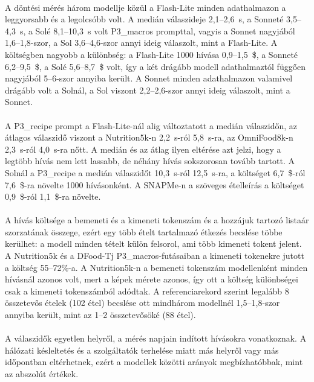 \paragraph{}A döntési mérés három modellje közül a Flash-Lite minden adathalmazon a leggyorsabb 
és a legolcsóbb volt. A medián válaszideje 2,1--2,6~s, a Sonneté 3,5--4,3~s, a Solé 
8,1--10,3~s volt P3\_macros prompttal, vagyis a Sonnet nagyjából 1,6--1,8-szor, 
a Sol 3,6--4,6-szor annyi ideig válaszolt, mint a Flash-Lite. A költségben 
nagyobb a különbség: a Flash-Lite 1000 hívása 0,9--1,5~\$, a Sonneté 
6,2--9,5~\$, a Solé 5,6--8,7~\$ volt, így a két drágább modell adathalmaztól 
függően nagyjából 5--6-szor annyiba került. A Sonnet minden adathalmazon 
valamivel drágább volt a Solnál, a Sol viszont 2,2--2,6-szor annyi ideig 
válaszolt, mint a Sonnet.

\paragraph{}A P3\_recipe prompt a Flash-Lite-nál alig változtatott a medián 
válaszidőn, az átlagos válaszidő viszont a Nutrition5k-n 2,2~s-ról 5,8~s-ra, 
az OmniFood8k-n 2,3~s-ról 4,0~s-ra nőtt. A medián és az átlag ilyen eltérése 
azt jelzi, hogy a legtöbb hívás nem lett lassabb, de néhány hívás sokszorosan 
tovább tartott. A Solnál a P3\_recipe a medián válaszidőt 10,3~s-ról 
12,5~s-ra, a költséget 6,7~\$-ról 7,6~\$-ra növelte 1000 hívásonként. A 
SNAPMe-n a szöveges ételleírás a költséget 0,9~\$-ról 1,1~\$-ra növelte.

\paragraph{}A hívás költsége a bemeneti és a kimeneti tokenszám és a hozzájuk tartozó 
listaár szorzatának összege, ezért egy több ételt tartalmazó étkezés becslése többe 
kerülhet: a modell minden tételt külön felsorol, ami több kimeneti tokent jelent. A 
Nutrition5k és a DFood-Tj P3\_macros-futásaiban a kimeneti tokenekre jutott a költség 
55--72\%-a. A Nutrition5k-n a bemeneti tokenszám modellenként minden hívásnál azonos volt, 
mert a képek mérete azonos, így ott a költség különbségei csak a kimeneti tokenszámból 
adódtak. A referenciarekord szerint legalább 8 összetevős ételek (102 étel) becslése ott 
mindhárom modellnél 1,5--1,8-szor annyiba került, mint az 1--2 összetevősöké (88 étel).

\paragraph{}A válaszidők egyetlen helyről, a mérés napjain indított hívásokra 
vonatkoznak. A hálózati késleltetés és a szolgáltatók terhelése miatt más 
helyről vagy más időpontban eltérhetnek, ezért a modellek közötti arányok 
megbízhatóbbak, mint az abszolút értékek.

